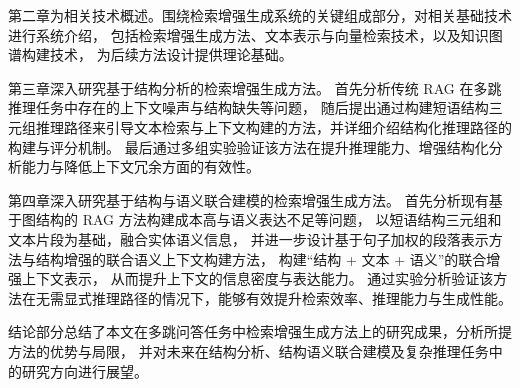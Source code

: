 第二章为相关技术概述。围绕检索增强生成系统的关键组成部分，对相关基础技术进行系统介绍，
包括检索增强生成方法、文本表示与向量检索技术，以及知识图谱构建技术，
为后续方法设计提供理论基础。

第三章深入研究基于结构分析的检索增强生成方法。
首先分析传统 RAG 在多跳推理任务中存在的上下文噪声与结构缺失等问题，
随后提出通过构建短语结构三元组推理路径来引导文本检索与上下文构建的方法，并详细介绍结构化推理路径的构建与评分机制。
最后通过多组实验验证该方法在提升推理能力、增强结构化分析能力与降低上下文冗余方面的有效性。

第四章深入研究基于结构与语义联合建模的检索增强生成方法。
首先分析现有基于图结构的 RAG 方法构建成本高与语义表达不足等问题，
以短语结构三元组和文本片段为基础，融合实体语义信息，
并进一步设计基于句子加权的段落表示方法与结构增强的联合语义上下文构建方法，
构建“结构 + 文本 + 语义”的联合增强上下文表示，
从而提升上下文的信息密度与表达能力。
通过实验分析验证该方法在无需显式推理路径的情况下，能够有效提升检索效率、推理能力与生成性能。

结论部分总结了本文在多跳问答任务中检索增强生成方法上的研究成果，分析所提方法的优势与局限，
并对未来在结构分析、结构语义联合建模及复杂推理任务中的研究方向进行展望。